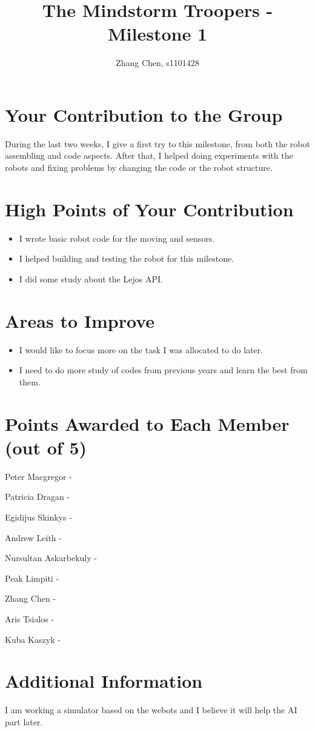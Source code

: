 \documentclass[dvips]{article}
\begin{document}
\sloppy
\title{The Mindstorm Troopers - Milestone 1}
 
\author{Zhang Chen, s1101428}
 
\maketitle

\section{Your Contribution to the Group}
During the last two weeks, I give a first try to this milestone, from both the robot assembling and code aspects. After that, I helped doing experiments with the robots and fixing problems by changing the code or the robot structure.

\section{High Points of Your Contribution}
\begin{itemize}
  \item I wrote basic robot code for the moving and sensors.
  \item I helped building and testing the robot for this milestone.
  \item I did some study about the Lejos API.
  
\end{itemize} 

\section{Areas to Improve}
\begin{itemize}
  \item I would like to focus more on the task I was allocated to do later.
  \item I need to do more study of codes from previous years and learn the best from them.
\end{itemize}


\section{Points Awarded to Each Member (out of 5)}
\begin{itemize}
\begin{multicols}{2}
\item Peter Macgregor - 
\item Patricia Dragan - 
\item Egidijus Skinkys - 
\item Andrew Leith - 
\item Nursultan Askarbekuly - 
\item Peak Limpiti - 
\item Zhang Chen - 
\item Aris Tsialos - 
\item Kuba Kaszyk - 
\end{multicols}
\end{itemize}

\section{Additional Information}
I am working a simulator based on the webots and I believe it will help the AI part later.
\end{document}
